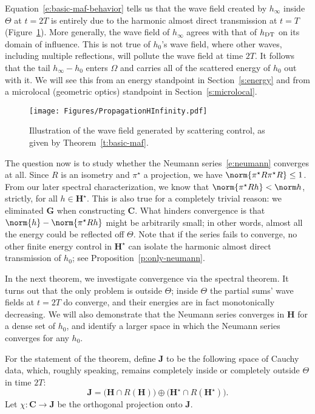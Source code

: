 \documentclass[10pt]{article}
\theoremstyle{plain}
\theoremstyle{definition}
\theoremstyle{remark}
\numberwithin{theorem}{section}
\numberwithin{example}{section}
\numberwithin{equation}{section}
\numberwithin{figure}{section}
\newcommand\DT{\ensuremath{_{\text{\normalfont DT}}}}		%
\begin{document}
Equation~\eqref{e:basic-maf-behavior} tells us that the wave field created by $h_\infty$ inside $\Theta$ at $t=2T$ is entirely due to the harmonic almost direct transmission at $t=T$ (Figure~\ref{f:basic-maf}). More generally, the wave field of $h_\infty$ agrees with that of $h\DT$ on its domain of influence. This is not true of $h_0$'s wave field, where other waves, including multiple reflections, will pollute the wave field at time $2T$. It follows that the tail $h_\infty-h_0$ enters $\Omega$ and carries all of the scattered energy of $h_0$ out with it. We will see this from an energy standpoint in Section~\ref{s:energy} and from a microlocal (geometric optics) standpoint in Section~\ref{s:microlocal}. 

\begin{figure}[tb]
	\centering
	\texttt{[image: Figures/PropagationHInfinity.pdf]}
	\caption{Illustration of the wave field generated by scattering control, as given by Theorem~\ref{t:basic-maf}.}
	\label{f:basic-maf}
\end{figure}



The question now is to study whether the Neumann series~\eqref{e:neumann} converges at all. Since $R$ is an isometry and $\pi^\star$ a projection, we have $\norm{\pi^\star R\pi^\star R}\leq 1$. From our later spectral characterization, we know that $\norm{\pi^\star R h}<\norm h$, strictly, for all $h\in\mathbf H^\star$. This is also true for a completely trivial reason: we eliminated $\mathbf G$ when constructing $\mathbf C$. What hinders convergence is that $\norm{h}-\norm{\pi^\star Rh}$ might be arbitrarily small; in other words, almost all the energy could be reflected off $\Theta$. Note that if the series fails to converge, no other finite energy control in $\mathbf H^\star$ can isolate the harmonic almost direct transmission of $h_0$; see Proposition~\ref{p:only-neumann}.

In the next theorem, we investigate convergence via the spectral theorem. It turns out that the only problem is outside $\Theta$; inside $\Theta$ the partial sums' wave fields at $t=2T$ do converge, and their energies are in fact monotonically decreasing. We will also demonstrate that the Neumann series converges in $\mathbf H$ for a dense set of $h_0$, and identify a larger space in which the Neumann series converges for any $h_0$.

For the statement of the theorem, define $\mathbf J$ to be the following space of Cauchy data, which, roughly speaking, remains completely inside or completely outside $\Theta$ in time $2T$:
\begin{equation}
	\mathbf J=\big(\mathbf H\cap R(\mathbf H)\big) \oplus \big(\mathbf H^\star \cap R(\mathbf H^\star)\big).
\end{equation}
Let $\chi\colon\mathbf C\to\mathbf J$ be the orthogonal projection onto $\mathbf J$.
\end{document}
